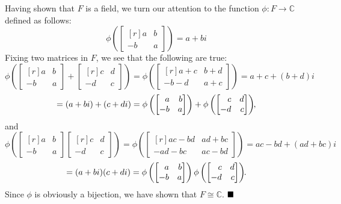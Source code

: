 \documentclass[12pt]{article}
\newcommand{\C}{\ensuremath{\mathbb{C}}}
\newcommand{\parenb}[1]{\left(#1\right)}
\newcommand{\done}{\ensuremath{\strut\hfill\blacksquare}}
\begin{document}
Having shown that \( F \) is a field, we turn our attention to the function
\( \phi : F \to \C \) defined as follows:
\[
	\phi\parenb{
		\begin{bmatrix*}[r]
			a & b \\ -b & a
		\end{bmatrix*}
	} = a + bi
\]
Fixing two matrices in \( F \), we see that the following are true:
\[
	\phi\parenb{
		\begin{bmatrix*}[r]
			a & b \\ -b & a
		\end{bmatrix*}
		+
		\begin{bmatrix*}[r]
			c & d \\ -d & c
		\end{bmatrix*}
	}
	= \phi\parenb{
		\begin{bmatrix*}[r]
			a + c & b + d \\ -b - d & a + c
		\end{bmatrix*}
	}
	= a + c + (b + d)i
\]
\[
	= (a + bi) + (c + di)
	= \phi\parenb{
		\begin{bmatrix*}[r]
			a & b \\ -b & a
		\end{bmatrix*}
	}
	+ \phi\parenb{
		\begin{bmatrix*}[r]
			c & d \\ -d & c
		\end{bmatrix*}
	}\kern-0.04in,
\]
and
\[
	\phi\parenb{
		\begin{bmatrix*}[r]
			a & b \\ -b & a
		\end{bmatrix*}
		\begin{bmatrix*}[r]
			c & d \\ -d & c
		\end{bmatrix*}
	}
	= \phi\parenb{
		\begin{bmatrix*}[r]
			ac - bd & ad + bc \\ -ad - bc & ac - bd
		\end{bmatrix*}
	}
	= ac - bd + (ad + bc)i
\]
\[
	= (a + bi)(c + di)
	= \phi\parenb{
		\begin{bmatrix*}[r]
			a & b \\ -b & a
		\end{bmatrix*}
	}
	\phi\parenb{
		\begin{bmatrix*}[r]
			c & d \\ -d & c
		\end{bmatrix*}
	}\kern-0.04in.
\]
Since \( \phi \) is obviously a bijection, we have shown that \( F \cong \C \).
\done
\end{document}
